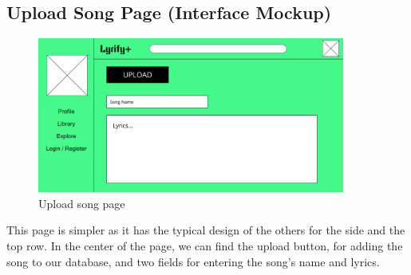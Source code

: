 \subsection{Upload Song Page (Interface Mockup)}

\begin{figure}[h!]
\centering
\includegraphics[width=0.9\textwidth]{sections/PLL/UploadSongMockUp.png}
\caption{Upload song page}
\end{figure}

This page is simpler as it has the typical design of the others for the side and the top row. In the center of the page, we can find the upload button, for adding the song to our database, and two fields for entering the song’s name and lyrics. 